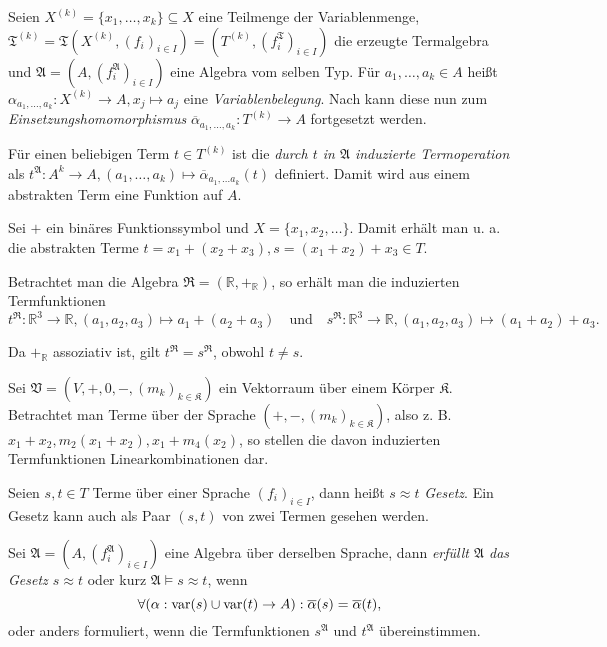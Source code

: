 \vspace*{-\lineskip}

\begin{definition}
    Seien $X^{(k)} = \{x_1, \ldots, x_k\} \subseteq X$ eine Teilmenge der Variablenmenge, $\mathfrak{T}^{(k)} = \mathfrak{T}(X^{(k)}, (f_i)_{i \in I}) = (T^{(k)}, (f_i^\mathfrak{T})_{i \in I})$ die erzeugte Termalgebra und $\mathfrak{A} = (A, (f_i^\mathfrak{A})_{i \in I})$ eine Algebra vom selben Typ. Für $a_1, \ldots, a_k \in A$ heißt $\alpha_{a_1, \ldots, a_k}: X^{(k)} \to A, x_j \mapsto a_j$ eine \emph{Variablenbelegung}. Nach  kann diese nun zum \emph{Einsetzungshomomorphismus} $\overline{\alpha}_{a_1, \ldots, a_k}: T^{(k)} \to A$ fortgesetzt werden.

    Für einen beliebigen Term $t \in T^{(k)}$ ist die \emph{durch $t$ in $\mathfrak{A}$ induzierte Termoperation} als $t^\mathfrak{A}: A^k \to A, (a_1, \ldots, a_k) \mapsto \overline{\alpha}_{a_1, \ldots a_k}(t)$ definiert. Damit wird aus einem abstrakten Term eine Funktion auf $A$.
\end{definition}

\begin{example}
    Sei $+$ ein binäres Funktionssymbol und $X = \{x_1, x_2, \ldots \}$. Damit erhält man u. a. die abstrakten Terme $t = x_1 + (x_2 + x_3), s = (x_1 + x_2) + x_3 \in T$.

    Betrachtet man die Algebra $\mathfrak{R} = (\mathbb{R}, +_\mathbb{R})$, so erhält man die induzierten Termfunktionen $$t^\mathfrak{R}: \mathbb{R}^3 \to \mathbb{R}, (a_1, a_2, a_3) \mapsto a_1 + (a_2 + a_3) \quad \text{und} \quad s^\mathfrak{R}: \mathbb{R}^3 \to \mathbb{R}, (a_1, a_2, a_3) \mapsto (a_1 + a_2) + a_3.$$

    Da $+_\mathbb{R}$ assoziativ ist, gilt $t^\mathfrak{R} = s^\mathfrak{R}$, obwohl $t \neq s$.
\end{example}

\begin{example}
    Sei $\mathfrak{V} = (V, +, 0, -, (m_k)_{k \in \mathfrak{K}})$ ein Vektorraum über einem Körper $\mathfrak{K}$. Betrachtet man Terme über der Sprache $(+, -, (m_k)_{k \in \mathfrak{K}})$, also z. B. $x_1 + x_2, m_2(x_1 + x_2), x_1 + m_4(x_2)$, so stellen die davon induzierten Termfunktionen Linearkombinationen dar.
\end{example}

\begin{definition}
    Seien $s, t \in T$ Terme über einer Sprache $(f_i)_{i \in I}$, dann heißt $s \approx t$ \emph{Gesetz}. Ein Gesetz kann auch als Paar $(s, t)$ von zwei Termen gesehen werden.

    Sei $\mathfrak{A} = (A, (f_i^\mathfrak{A})_{i \in I})$ eine Algebra über derselben Sprache, dann \emph{erfüllt $\mathfrak{A}$ das Gesetz $s \approx t$} oder kurz \emph{$\mathfrak{A} \models s \approx t$}, wenn 
    $$ \forall (\alpha: \operatorname{var}(s) \cup \operatorname{var}(t) \to A): \overline{\alpha}(s) = \overline{\alpha}(t), $$
    oder anders formuliert, wenn die Termfunktionen $s^\mathfrak{A}$ und $t^\mathfrak{A}$ übereinstimmen.
\end{definition}